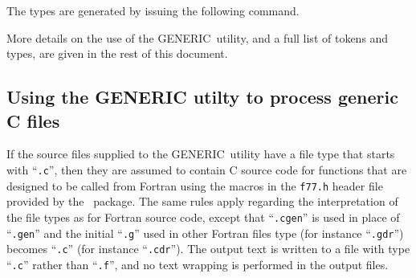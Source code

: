 \documentclass[twoside,11pt,nolof]{starlink}
\providecommand{\GENERIC}{{\footnotesize GENERIC}\normalsize}
\providecommand{\CNF}{{\footnotesize CNF}\normalsize}
\providecommand{\CNFref}{\xref{\CNF}{sun209}{}}
\begin{document}
The types are generated by issuing the following command.

\begin{terminalv}
\end{terminalv}

More details on the use of the \GENERIC\ utility, and a full list of
tokens and types, are given in the rest of this document.

\subsection{Using the GENERIC utilty to process generic C files}
If the source files supplied to the \GENERIC\ utility have a file type
that starts with ``\verb+.c+'', then they are assumed to contain C source
code for functions that are designed to be called from Fortran using the
macros in the \verb+f77.h+ header file provided by the \CNFref\ package.
The same rules apply regarding the interpretation of the file types as
for Fortran source code, except that ``\verb+.cgen+'' is used in place of
``\verb+.gen+'' and the initial ``\verb+.g+'' used in other Fortran files
type (for instance ``\verb+.gdr+'') becomes ``\verb+.c+'' (for instance
``\verb+.cdr+''). The output text is written to a file with type
``\verb+.c+'' rather than ``\verb+.f+'', and no text wrapping is performed
in the output files.
\end{document}
